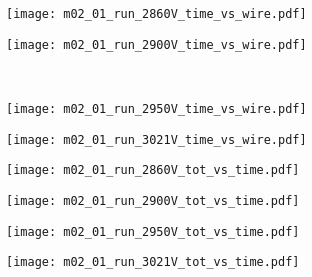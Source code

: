 \documentclass[11pt, ngerman, fleqn, DIV=15, headinclude, BCOR=2cm]{scrreprt}
\begin{document}
\begin{appendix}
	\begin{figure}
		\centering
	\begin{subfigure}[a]{0.45 \textwidth}
		\texttt{[image: m02\_01\_run\_2860V\_time\_vs\_wire.pdf]}
		\caption{%
		}
		\label{fig:m02_01_run_2860V_time_vs_wire}
	\end{subfigure}
	\begin{subfigure}[a]{0.45 \textwidth}
		\texttt{[image: m02\_01\_run\_2900V\_time\_vs\_wire.pdf]}
		\caption{%
		}
		\label{fig:m02_01_run_2900V_time_vs_wire}
	\end{subfigure}
	\\
	\begin{subfigure}[a]{0.45 \textwidth}
		\texttt{[image: m02\_01\_run\_2950V\_time\_vs\_wire.pdf]}
		\caption{%
		}
		\label{fig:m02_01_run_2950V_time_vs_wire}
	\end{subfigure}
	\begin{subfigure}[a]{0.45 \textwidth}
		\texttt{[image: m02\_01\_run\_3021V\_time\_vs\_wire.pdf]}
		\caption{%
		}
		\label{fig:m02_01_run_3021V_time_vs_wire}
	\end{subfigure}
	\caption{%
	}
	\label{fig:m02_01_time_vs_wire}
	\end{figure}



	\begin{figure}
		\centering
	\begin{subfigure}[a]{0.45 \textwidth}
		\texttt{[image: m02\_01\_run\_2860V\_tot\_vs\_time.pdf]}
		\caption{%
		}
		\label{fig:m02_01_run_2860V_tot_vs_time}
	\end{subfigure}
	\begin{subfigure}[a]{0.45 \textwidth}
		\texttt{[image: m02\_01\_run\_2900V\_tot\_vs\_time.pdf]}
		\caption{%
		}
		\label{fig:m02_01_run_2900V_tot_vs_time}
	\end{subfigure}
	\begin{subfigure}[a]{0.45 \textwidth}
		\texttt{[image: m02\_01\_run\_2950V\_tot\_vs\_time.pdf]}
		\caption{%
		}
		\label{fig:m02_01_run_2950V_tot_vs_time}
	\end{subfigure}
	\begin{subfigure}[a]{0.45 \textwidth}
		\texttt{[image: m02\_01\_run\_3021V\_tot\_vs\_time.pdf]}
		\caption{%
		}
		\label{fig:m02_01_run_3021V_tot_vs_time}
	\end{subfigure}
	\caption{%
	}
	\label{fig:m02_01_tot_vs_time}
	\end{figure}


\end{appendix}
\end{document}
